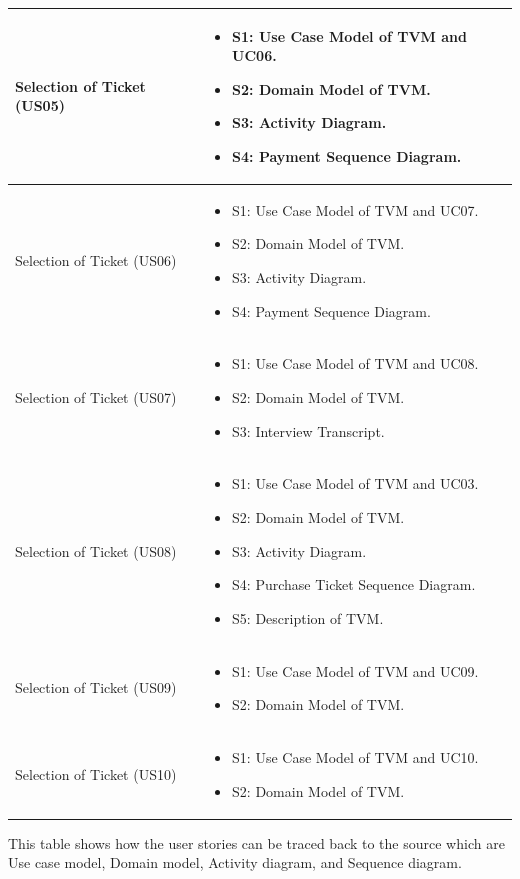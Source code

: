 \documentclass[15pt]{article}
\begin{document}
\begin{center}
\begin{longtable}{| p{} | p{} |}
Selection of Ticket (US05)
 &  \begin{itemize}
  \item S1: Use Case Model of TVM and UC06.
  \item S2: Domain Model of TVM.
  \item S3: Activity Diagram.
  \item S4: Payment Sequence Diagram.
  \end{itemize}   \\
 \hline
 
Selection of Ticket (US06)
 &  \begin{itemize}
  \item S1: Use Case Model of TVM and UC07.
  \item S2: Domain Model of TVM.
  \item S3: Activity Diagram.
  \item S4: Payment Sequence Diagram.
  \end{itemize}   \\
 \hline
 
Selection of Ticket (US07)
 &  \begin{itemize}
  \item S1: Use Case Model of TVM and UC08.
  \item S2: Domain Model of TVM.
  \item S3: Interview Transcript.
  \end{itemize}   \\
 \hline
 
 Selection of Ticket (US08)
 &  \begin{itemize}
  \item S1: Use Case Model of TVM and UC03.
  \item S2: Domain Model of TVM.
  \item S3: Activity Diagram.
  \item S4: Purchase Ticket Sequence Diagram.
  \item S5: Description of TVM.
  \end{itemize}   \\
 \hline
 
 
 Selection of Ticket (US09)
 &  \begin{itemize}
  \item S1: Use Case Model of TVM and UC09.
  \item S2: Domain Model of TVM.
  \end{itemize}   \\
 \hline
 
 
 
Selection of Ticket (US10)
 &  \begin{itemize}
  \item S1: Use Case Model of TVM and UC10.
  \item S2: Domain Model of TVM.
  \end{itemize}   \\
 [1ex] 
 \hline
\end{longtable}
\end{center}
\vspace{1cm}

This table shows how the user stories can be traced back to the source which are Use case model, Domain model, Activity diagram, and Sequence diagram.




\end{document}
